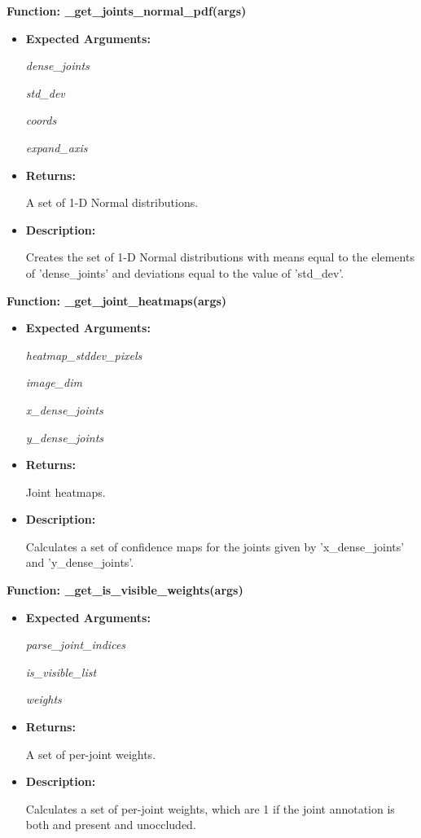 \documentclass{scrreprt}
\begin{document}
\textbf{Function: \_get\_joints\_normal\_pdf(args)}
\begin{itemize}
    \item \textbf{Expected Arguments:}

            \quad\textit{dense\_joints}

            \quad\textit{std\_dev}

            \quad\textit{coords}

            \quad\textit{expand\_axis}

    \item \textbf{Returns:}

            A set of 1-D Normal distributions.

    \item \textbf{Description:}

            Creates the set of 1-D Normal distributions with means equal to the elements of 'dense\_joints' and deviations equal to the value of 'std\_dev'.

\end{itemize}

\textbf{Function: \_get\_joint\_heatmaps(args)}
\begin{itemize}
    \item \textbf{Expected Arguments:}

            \quad\textit{heatmap\_stddev\_pixels}

            \quad\textit{image\_dim}

            \quad\textit{x\_dense\_joints}

            \quad\textit{y\_dense\_joints}

    \item \textbf{Returns:}

            Joint heatmaps.

    \item \textbf{Description:}

            Calculates a set of confidence maps for the joints given by 'x\_dense\_joints' and 'y\_dense\_joints'.
\end{itemize}

\textbf{Function: \_get\_is\_visible\_weights(args)}
\begin{itemize}
    \item \textbf{Expected Arguments:}

            \quad\textit{parse\_joint\_indices}

            \quad\textit{is\_visible\_list}

            \quad\textit{weights}

    \item \textbf{Returns:}

            A set of per-joint weights.

    \item \textbf{Description:}

            Calculates a set of per-joint weights, which are 1 if the joint annotation is both and present and unoccluded.

\end{itemize}
\end{document}
